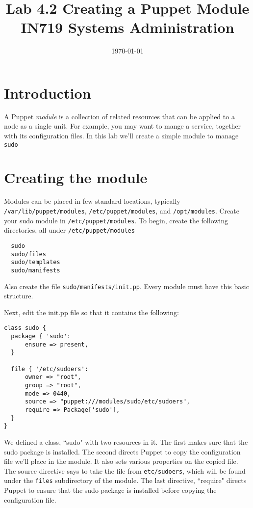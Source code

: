 \documentclass{article}   	%
\title{Lab 4.2 Creating a Puppet Module \\ IN719 Systems Administration}
\date{\today}							%
\begin{document}
\maketitle

\section*{Introduction}
A Puppet \emph{module} is a collection of related resources that can be applied to a node as a single unit. For example, you may want to mange a service, together with its configuration files.  In this lab we'll create a simple module to manage \texttt{sudo}

\section*{Creating the module}
Modules can be placed in few standard locations, typically \texttt{/var/lib/puppet/modules}, \texttt{/etc/puppet/modules}, and \texttt{/opt/modules}.  Create your sudo module in \texttt{/etc/puppet/modules}.  To begin, create the following directories, all under \texttt{/etc/puppet/modules}
\begin{verbatim}
  sudo
  sudo/files
  sudo/templates
  sudo/manifests
\end{verbatim}
Also create the file \texttt{sudo/manifests/init.pp}.  Every module must have this basic structure.

Next, edit the init.pp file so that it contains the following:

\newpage

\begin{verbatim}
class sudo {
  package { 'sudo':
      ensure => present,
  }

  file { '/etc/sudoers':
      owner => "root",
      group => "root",
      mode => 0440,
      source => "puppet:///modules/sudo/etc/sudoers",
      require => Package['sudo'],
  }
}
\end{verbatim}

We defined a class, ``sudo" with two resources in it.  The first makes sure that the sudo package is installed.  The second directs Puppet to copy the configuration file we'll place in the module.  It also sets various properties on the copied file.  The source directive says to take the file from \texttt{etc/sudoers}, which will be found under the \texttt{files} subdirectory of the module.  The last directive, ``require" directs Puppet to ensure that the sudo package is installed before copying the configuration file.
\end{document}
